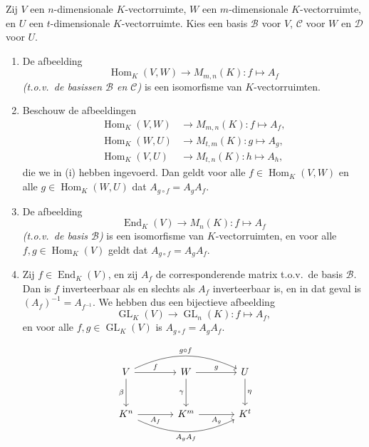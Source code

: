 \begin{stelling}[4.1.8]
    Zij $V$ een $n$-dimensionale $K$-vectorruimte, $W$ een $m$-dimensionale $K$-vectorruimte, en $U$ een $t$-dimensionale $K$-vectorruimte. Kies een basis $\mathcal{B}$ voor $V$, $\mathcal{C}$ voor $W$ en $\mathcal{D}$ voor $U$.
    \begin{enumerate}
        \item[(i)] De afbeelding
        \[ \operatorname{Hom}_K(V, W) \to M_{m,n}(K) \colon f \mapsto A_f \]
        \emph{(t.o.v.\ de basissen $\mathcal{B}$ en $\mathcal{C}$)} is een isomorfisme van $K$-vectorruimten.
        \item[(ii)] Beschouw de afbeeldingen
        \begin{align*}
            \operatorname{Hom}_K(V, W) &\to M_{m,n}(K) \colon f \mapsto A_f, \\
            \operatorname{Hom}_K(W, U) &\to M_{t,m}(K) \colon g \mapsto A_g, \\
            \operatorname{Hom}_K(V, U) &\to M_{t,n}(K) \colon h \mapsto A_h,
        \end{align*}
        die we in (i) hebben ingevoerd. Dan geldt voor alle $f \in \operatorname{Hom}_K(V, W)$ en alle $g \in \operatorname{Hom}_K(W, U)$ dat $A_{g \circ f} = A_g A_f$.
        \item[(iii)] De afbeelding
        \[ \operatorname{End}_K(V) \to M_n(K) \colon f \mapsto A_f \]
        \emph{(t.o.v.\ de basis $\mathcal{B}$)} is een isomorfisme van $K$-vectorruimten, en voor alle $f, g \in \operatorname{Hom}_K(V)$ geldt dat $A_{g \circ f} = A_g A_f$.
        \item[(iv)] Zij $f \in \operatorname{End}_K(V)$, en zij $A_f$ de corresponderende matrix t.o.v.\ de basis $\mathcal{B}$. Dan is $f$ inverteerbaar als en slechts als $A_f$ inverteerbaar is, en in dat geval is $(A_f)^{-1} = A_{f^{-1}}$. We hebben dus een bijectieve afbeelding
        \[ \operatorname{GL}_K(V) \to \operatorname{GL}_n(K) \colon f \mapsto A_f, \]
        en voor alle $f, g \in \operatorname{GL}_K(V)$ is $A_{g \circ f} = A_g A_f$.
    \end{enumerate}
\end{stelling}
\begin{equation*}
\begin{tikzcd}[row sep=large, column sep=large]
    V \arrow[r, "f"] \arrow[d, "\beta"'] \arrow[rr, "g \circ f", bend left=25] &
    W \arrow[r, "g"] \arrow[d, "\gamma"'] &
    U \arrow[d, "\eta"] \\
    K^n \arrow[r, "A_f"'] \arrow[rr, "A_g A_f"', bend right=25] &
    K^m \arrow[r, "A_g"'] &
    K^t
\end{tikzcd}
\end{equation*}
